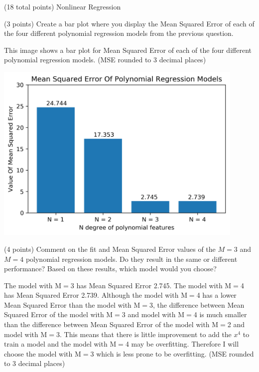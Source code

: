 \documentclass[12pt]{article}
\begin{document}
\begin{question}{(18 total points) Nonlinear Regression}
\begin{subquestion}
\end{subquestion}


%
%
\begin{subquestion}{(3 points) Create a bar plot where you display the Mean Squared Error of each of the four different polynomial regression models from the previous question.}


\begin{answerbox}{35em}
This image shows a bar plot for Mean Squared Error of each of the four different polynomial regression models. (MSE rounded to 3 decimal places)
\begin{center}
\includegraphics[width=0.9\textwidth]{MSE.png}
\end{center}
\end{answerbox}



\end{subquestion}


%
%
\begin{subquestion}{(4 points) Comment on the fit and Mean Squared Error values of the $M=3$ and $M=4$ polynomial regression models. 
Do they result in the same or different performance? 
Based on these results, which model would you choose?}


\begin{answerbox}{15em}
The model with M$=$3 has Mean Squared Error 2.745. The model with M$=$4 has Mean Squared Error 2.739. Although the model with M$=$4 has a lower Mean Squared Error than the model with M$=$3, the difference between Mean Squared Error of the model with M$=$3 and model with M$=$4 is much smaller than the difference between Mean Squared Error of the model with M$=$2 and model with M$=$3. This means that there is little improvement to add the $x^{4}$ to train a model and the model with M$=$4 may be overfitting. Therefore I will choose the model with M$=$3 which is less prone to be overfitting. (MSE rounded to 3 decimal places)
\end{answerbox}




\end{subquestion}
\end{question}
\end{document}

